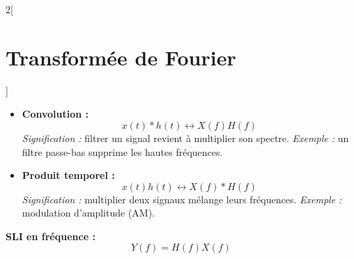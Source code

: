 \documentclass[a4paper,10pt]{article}
\begin{document}
\begin{multicols}{2}[
    \section{Transformée de Fourier}
    ]
\begin{itemize}
            \item \textbf{Convolution :}
            \[
            x(t)*h(t) \longleftrightarrow X(f)H(f)
            \]
            \textit{Signification :} filtrer un signal revient à multiplier son spectre.  
            \textit{Exemple :} un filtre passe-bas supprime les hautes fréquences.

            \item \textbf{Produit temporel :}
            \[
            x(t)h(t) \longleftrightarrow X(f)*H(f)
            \]
            \textit{Signification :} multiplier deux signaux mélange leurs fréquences.  
            \textit{Exemple :} modulation d’amplitude (AM).

        \end{itemize}

        \textbf{SLI en fréquence :}
        \[
        Y(f) = H(f) X(f)
        \]
    
    \end{multicols}
    
\end{document}
